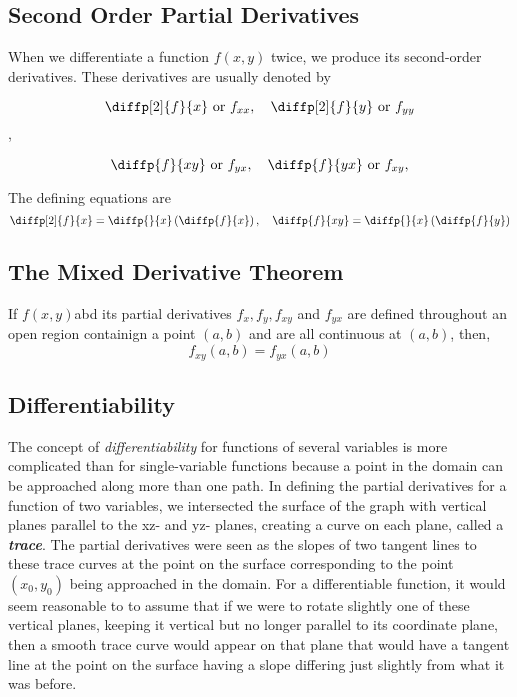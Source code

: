 \documentclass[12pt,a4paper]{article}
\newenvironment{theorem}{\begin{theorembox}}{\end{theorembox}\vspace{1\baselineskip}}
\newcommand{\fxy}{\(f(x,y)\)}
\begin{document}
\subsection{Second Order Partial Derivatives}

When we differentiate a function \(f(x,y)\) twice, we produce its second-order derivatives. These derivatives are usually denoted by

\[\diffp[2]{f}{x} \ \text{or} \ f_{xx}, \quad \diffp[2]{f}{y} \ \text{or} \ f_{yy} \],

\[\diffp{f}{{x}{y}} \ \text{or} \ f_{yx}, \quad \diffp{f}{{y}{x}} \ \text{or} \ f_{xy},\]

The defining equations are
\[\diffp[2]{f}{x} = \diffp{}{x}\left(\diffp{f}{x}\right), \quad \diffp{f}{{x}{y}} = \diffp{}{x}\left(\diffp{f}{y}\right)\]


\subsection{The Mixed Derivative Theorem}

\begin{theorem}
    If \fxy abd its partial derivatives \(f_x, f_y, f_{xy}\) and \(f_{yx}\) are defined throughout an open region containign a point \((a,b)\) and are all continuous at  \((a,b)\), then,
    \[f_{xy}(a,b) = f_{yx}(a,b)\]
\end{theorem}

\newpage

\subsection{Differentiability}

The concept of \textit{differentiability} for functions of several variables is more complicated than for single-variable functions because a point in the domain can be approached along more than one path. 
In defining the partial derivatives for a function of two variables, we intersected the surface of the graph with vertical planes parallel to the xz- and yz- planes, creating a curve on each plane, called a \textit{\textbf{trace}}. The partial derivatives were seen as the slopes of two tangent lines to these trace curves at the point on the surface corresponding to the point \((x_0,y_0)\) being approached in the domain. For a differentiable function, it would seem reasonable to to assume that if we were to rotate slightly one of these vertical planes, keeping it vertical but no longer parallel to its coordinate plane, then a smooth trace curve would appear on that plane that would have a tangent line at the point on the surface having a slope differing just slightly from what it was before. 
\end{document}
